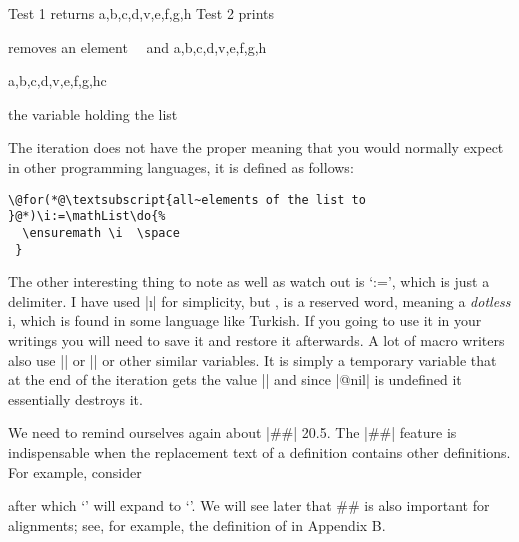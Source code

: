\documentclass{ltxdoc}
\begin{document}
\begin{teX}
\makeatletter
\def\atestiii{}
\def\alist{a,b,c,d,v,e,f,g,h}
Test 1 \@removeelement{v}{a,b,c,d,v,e,f,g,h}{\atestiii} 
returns \atestiii
\alist
\gdef\blist{1,2,3,4,5,v,6,7}%
Test 2 \@removeelement{v}{\expand\blist}{\atestii} prints \atestii
\meaning\atestii
\meaning\@removeelement

\def\remove#1#2{
 \@removeelement #2{#1}\atestiii \atestiii
}

removes an element \atestiii ~~and \alist

\remove c\alist 


the variable holding the list \atestiii
\end{teX}


The iteration does not have the proper meaning that you would normally expect in other programming languages, it is defined as follows:


\begin{verbatim}
\@for(*@\textsubscript{all~elements of the list to }@*)\i:=\mathList\do{%
  \ensuremath \i  \space 
 }
\end{verbatim}

The other interesting thing to note as well as watch out is `:=', which is just a delimiter. I have used |\i| for simplicity, but \cmd{\i}, is a reserved word, meaning a \textit{dotless} i, which is found in some language like Turkish. If you going to use it in your writings you will need to save it and restore it afterwards. A lot of macro writers also use |\ii| or |\@i| or other similar variables. It is simply a temporary variable that at the end of the iteration gets the value |\@nil| and since |@nil| is undefined it essentially destroys it. 

We need to remind ourselves again about |##|
20.5. The |##| feature is indispensable when the replacement text of a definition
contains other definitions. For example, consider


\begin{teX}
\def\a#1{\def\b##1{##1#1}}
after which `\a!' will expand to `\def\b#1{#1!}'. We will see later that ## is also
important for alignments; see, for example, the definition of \matrix in Appendix B.
\end{teX}
\end{document}

